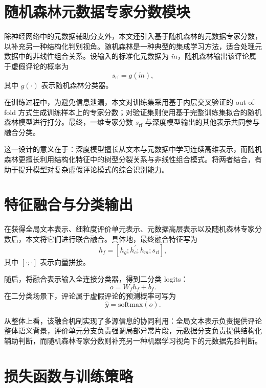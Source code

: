 \documentclass[UTF8,oneside,openright,fontset=none]{ctexbook}
\numberwithin{equation}{chapter}
\begin{document}
\section{随机森林元数据专家分数模块}

除神经网络中的元数据辅助分支外，本文还引入基于随机森林的元数据专家分数，以补充另一种结构化判别视角。随机森林是一种典型的集成学习方法，适合处理元数据中的非线性组合关系。设输入的标准化元数据为 $\tilde{m}$，随机森林输出该评论属于虚假评论的概率为
\begin{equation}
  s_{\mathrm{rf}} = g(\tilde{m}),
\end{equation}
其中 $g(\cdot)$ 表示随机森林分类器。

在训练过程中，为避免信息泄漏，本文对训练集采用基于内层交叉验证的 out-of-fold 方式生成训练样本上的专家分数；对验证集则使用基于完整训练集拟合的随机森林模型进行打分。最终，一维专家分数 $s_{\mathrm{rf}}$ 与深度模型输出的其他表示共同参与融合分类。

这一设计的意义在于：深度模型擅长从文本与元数据中学习连续高维表示，而随机森林更擅长利用结构化特征中的树型分裂关系与非线性组合模式。将两者结合，有助于提升模型对复杂虚假评论模式的综合识别能力。

\section{特征融合与分类输出}

在获得全局文本表示、细粒度评价单元表示、元数据高层表示以及随机森林专家分数后，本文将它们进行联合融合。具体地，最终融合特征写为
\begin{equation}
  h_f = [h_g;h_c^{\prime};h_m;s_{\mathrm{rf}}],
\end{equation}
其中 $[\cdot;\cdot]$ 表示向量拼接。

随后，将融合表示输入全连接分类器，得到二分类 logits：
\begin{equation}
  o = W_f h_f + b_f.
\end{equation}
在二分类场景下，评论属于虚假评论的预测概率可写为
\begin{equation}
  \hat{y} = \mathrm{softmax}(o).
\end{equation}

从整体上看，该融合机制实现了多源信息的协同利用：全局文本表示负责提供评论整体语义背景，评价单元分支负责强调局部异常片段，元数据分支负责提供结构化辅助判断，而随机森林专家分数则补充另一种机器学习视角下的元数据先验判断。

\section{损失函数与训练策略}
\end{document}
